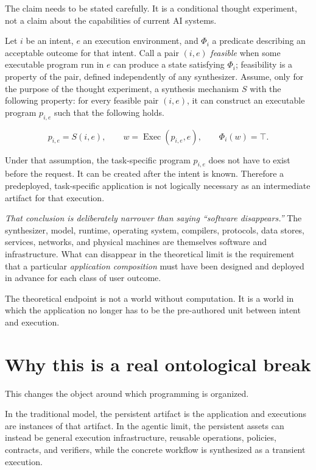 \documentclass[10pt,oneside,openany]{book}
\newcommand{\keyidea}[1]{%
  \vspace{3pt}
  \noindent\fbox{\begin{minipage}{0.94\linewidth}\small\raggedright\textbf{Key idea.} #1\end{minipage}}
  \vspace{3pt}
}
\renewcommand{\keyidea}[1]{\begin{keyideabox}#1\end{keyideabox}}
\begin{document}
The claim needs to be stated carefully. It is a conditional thought experiment, not a claim about the capabilities of current AI systems.

Let $i$ be an intent, $e$ an execution environment, and $\Phi_i$ a predicate describing an acceptable outcome for that intent. Call a pair $(i,e)$ \emph{feasible} when some executable program run in $e$ can produce a state satisfying $\Phi_i$; feasibility is a property of the pair, defined independently of any synthesizer. Assume, only for the purpose of the thought experiment, a synthesis mechanism $S$ with the following property: for every feasible pair $(i,e)$, it can construct an executable program $p_{i,e}$ such that the following holds.
\begin{formulabox}
\[
 p_{i,e} = S(i,e),
 \qquad
 w = \operatorname{Exec}(p_{i,e},e),
 \qquad
 \Phi_i(w)=\top.
\]
\end{formulabox}
Under that assumption, the task-specific program $p_{i,e}$ does not have to exist before the request. It can be created after the intent is known. Therefore a predeployed, task-specific application is not logically necessary as an intermediate artifact for that execution.

\emph{That conclusion is deliberately narrower than saying ``software disappears.''} The synthesizer, model, runtime, operating system, compilers, protocols, data stores, services, networks, and physical machines are themselves software and infrastructure. What can disappear in the theoretical limit is the requirement that a particular \emph{application composition} must have been designed and deployed in advance for each class of user outcome.

\keyidea{The theoretical endpoint is not a world without computation. It is a world in which the application no longer has to be the pre-authored unit between intent and execution.}

\section{Why this is a real ontological break}

This changes the object around which programming is organized.

In the traditional model, the persistent artifact is the application and executions are instances of that artifact. In the agentic limit, the persistent assets can instead be general execution infrastructure, reusable operations, policies, contracts, and verifiers, while the concrete workflow is synthesized as a transient execution.
\end{document}
